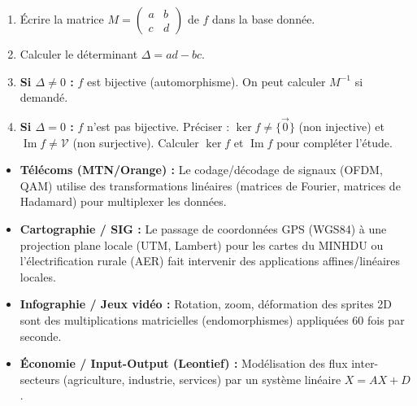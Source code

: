 \documentclass[11pt]{article}
\begin{document}
\begin{methode}
\begin{enumerate}
  \item Écrire la matrice $M = \begin{pmatrix} a & b \\ c & d \end{pmatrix}$ de $f$ dans la base donnée.
  \item Calculer le déterminant $\Delta = ad - bc$.
  \item \textbf{Si $\Delta \neq 0$ :} $f$ est bijective (automorphisme). On peut calculer $M^{-1}$ si demandé.
  \item \textbf{Si $\Delta = 0$ :} $f$ n'est pas bijective. Préciser : $\ker f \neq \{\vec{0}\}$ (non injective) et $\operatorname{Im} f \neq \mathcal{V}$ (non surjective). Calculer $\ker f$ et $\operatorname{Im} f$ pour compléter l'étude.
\end{enumerate}
\end{methode}

\begin{savaistu}
\begin{itemize}
  \item \textbf{Télécoms (MTN/Orange) :} Le codage/décodage de signaux (OFDM, QAM) utilise des transformations linéaires (matrices de Fourier, matrices de Hadamard) pour multiplexer les données.
  \item \textbf{Cartographie / SIG :} Le passage de coordonnées GPS (WGS84) à une projection plane locale (UTM, Lambert) pour les cartes du MINHDU ou l'électrification rurale (AER) fait intervenir des applications affines/linéaires locales.
  \item \textbf{Infographie / Jeux vidéo :} Rotation, zoom, déformation des sprites 2D sont des multiplications matricielles (endomorphismes) appliquées 60 fois par seconde.
  \item \textbf{Économie / Input-Output (Leontief) :} Modélisation des flux inter-secteurs (agriculture, industrie, services) par un système linéaire $X = AX + D$.
\end{itemize}
\end{savaistu}
\end{document}
